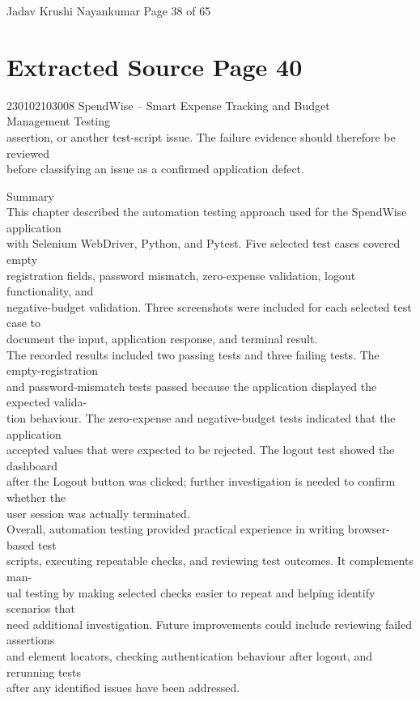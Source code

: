 \documentclass[12pt,a4paper]{report}
\begin{document}
\smallskip
Jadav Krushi Nayankumar                                                       Page 38 of 65\\ 

\clearpage
\section*{Extracted Source Page 40}
230102103008                          SpendWise – Smart Expense Tracking and Budget\\ 
Management Testing\\ 

\smallskip
assertion, or another test-script issue. The failure evidence should therefore be reviewed\\ 
before classifying an issue as a confirmed application defect.\\ 

\smallskip

 Summary\\ 

\smallskip
This chapter described the automation testing approach used for the SpendWise application\\ 
with Selenium WebDriver, Python, and Pytest. Five selected test cases covered empty\\ 
registration fields, password mismatch, zero-expense validation, logout functionality, and\\ 
negative-budget validation. Three screenshots were included for each selected test case to\\ 
document the input, application response, and terminal result.\\ 
The recorded results included two passing tests and three failing tests. The empty-registration\\ 
and password-mismatch tests passed because the application displayed the expected valida-\\ 
tion behaviour. The zero-expense and negative-budget tests indicated that the application\\ 
accepted values that were expected to be rejected. The logout test showed the dashboard\\ 
after the Logout button was clicked; further investigation is needed to confirm whether the\\ 
user session was actually terminated.\\ 
Overall, automation testing provided practical experience in writing browser-based test\\ 
scripts, executing repeatable checks, and reviewing test outcomes. It complements man-\\ 
ual testing by making selected checks easier to repeat and helping identify scenarios that\\ 
need additional investigation. Future improvements could include reviewing failed assertions\\ 
and element locators, checking authentication behaviour after logout, and rerunning tests\\ 
after any identified issues have been addressed.\\ 
\end{document}
